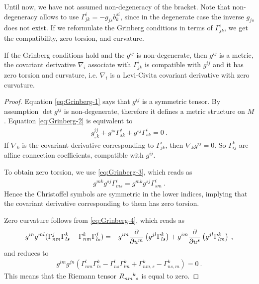 Until now, we have not assumed non-degeneracy of the bracket. Note that non-degeneracy allows to use $\Gamma^{i}_{jk} = - g_{js} b^{si}_k$, since in the degenerate case the inverse $g_{js}$ does not exist. If we reformulate the Grinberg conditions in terms of $\Gamma^{i}_{jk}$, we get the compatibility, zero torsion, and curvature.

\begin{lemma}
    If the Grinberg conditions hold and the $g^{ij}$ is non-degenerate, then $g^{ij}$ is a metric, the covariant derivative $\nabla_i$ associate with $\Gamma^{i}_{jk}$ is compatible with $g^{ij}$ and it has zero torsion and curvature, i.e. $\nabla_i$ is a Levi-Civita covariant derivative with zero curvature.
\end{lemma}
\begin{proof}
    Equation \eqref{eq:Grinberg-1} says that $g^{ij}$ is a symmetric tensor. By assumption $\det g^{ij}$ is non-degenerate, therefore it defines a metric structure on $M$. Equation \eqref{eq:Grinberg-2} is equivalent to
    \begin{align}
        g^{ij}_{,k} + g^{is} \Gamma_{sk}^j + g^{sj} \Gamma_{sk}^i = 0 \:.
    \end{align}
    If $\nabla_k$ is the covariant derivative corresponding to $\Gamma^i_{jk}$, then $\nabla_k g^{ij} = 0$. So $\Gamma_{ij}^k$ are affine connection coefficients, compatible with $g^{ij}$.

    To obtain zero torsion, we use \eqref{eq:Grinberg-3}, which reads as 
    \begin{align}
        g^{mk} g^{sj} \Gamma^i_{ms} = g^{mk} g^{sj} \Gamma^i_{sm} \:.
    \end{align}
    Hence the Christoffel symbols are symmetric in the lower indices, implying that the covariant derivative corresponding to them has zero torsion.

    Zero curvature follows from \eqref{eq:Grinberg-4}, which reads as
    \begin{align}
        g^{in} g^{ml} (\Gamma^j_{nm} \Gamma^{k}_{ls} - \Gamma^k_{nm} \Gamma^j_{ls}) = - g^{im} \frac{\partial }{\partial u^m} \left( g^{jl} \Gamma^k_{ls}\right) + g^{im} \frac{\partial }{\partial u^s}\left( g^{jl} \Gamma^k_{lm}\right) \:,
    \end{align}
    and reduces to
    \begin{align}
        g^{im} g^{jn} \left( \Gamma^{l}_{nm} \Gamma^{k}_{ls} - \Gamma^{l}_{ns} \Gamma^k_{lm} + \Gamma^k_{nm,s} - \Gamma^k_{ns,m} \right) = 0 \:.
    \end{align}
    This means that the Riemann tensor $R\indices{_n_m^k_s}$ is equal to zero.
\end{proof}

